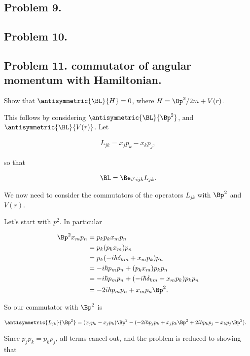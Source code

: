 \subsection{Problem 9. }
\subsection{Problem 10. }
\subsection{Problem 11. commutator of angular momentum with Hamiltonian.}

Show that $\antisymmetric{\BL}{H} = 0$, where $H = \Bp^2/2m + V(r)$.

This follows by considering $\antisymmetric{\BL}{\Bp^2}$, and $\antisymmetric{\BL}{V(r)}$.  Let

\begin{align}\label{eqn:desaiCh3:1100}
L_{jk} = x_j p_k - x_k p_j,
\end{align}

so that 

\begin{align}\label{eqn:desaiCh3:1101}
\BL = \Be_i \epsilon_{ijk} L_{jk}.
\end{align}

We now need to consider the commutators of the operators $L_{jk}$ with $\Bp^2$ and $V(r)$.

Let's start with $p^2$.  In particular

\begin{align*}
\Bp^2 x_m p_n
&=
p_k p_k x_m p_n \\
&=
p_k (p_k x_m) p_n \\
&=
p_k (-i\hbar \delta_{km} + x_m p_k) p_n \\
&=
-i\hbar p_m p_n + (p_k x_m) p_k p_n \\
&=
-i\hbar p_m p_n + (-i \hbar \delta_{km} + x_m p_k ) p_k p_n \\
&=
-2 i\hbar p_m p_n + x_m p_n \Bp^2.
\end{align*}

So our commutator with $\Bp^2$ is

\begin{align*}
\antisymmetric{L_{jk}}{\Bp^2}
&=
(x_j p_k - x_j p_k) \Bp^2 
-( -2 i\hbar p_j p_k + x_j p_k \Bp^2 +2 i\hbar p_k p_j - x_k p_j \Bp^2 ).
\end{align*}

Since $p_j p_k = p_k p_j$, all terms cancel out, and the problem is reduced to showing that 

